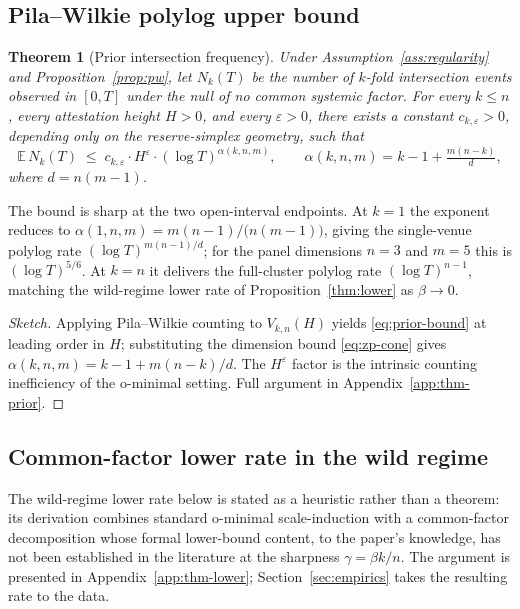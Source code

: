 \documentclass[12pt]{article}
\theoremstyle{sampledef}
\theoremstyle{sampleplain}
\newtheorem{theorem}[definition]{Theorem}
\theoremstyle{sampleremark}
\newcommand{\E}{\mathbb{E}}
\newcommand{\1}{\mathbf{1}}
\begin{document}
\subsection{Pila--Wilkie polylog upper bound}\label{sec:thm-prior}

\begin{theorem}[Prior intersection frequency]\label{thm:prior}
Under Assumption~\ref{ass:regularity} and
Proposition~\ref{prop:pw}, let $N_k(T)$ be the number of $k$-fold
intersection events observed in $[0,T]$ under the null of no common
systemic factor. For every $k \le n$, every attestation height
$H > 0$, and every $\varepsilon > 0$, there exists a constant
$c_{k,\varepsilon} > 0$, depending only on the reserve-simplex
geometry, such that
\begin{equation}\label{eq:prior-bound}
\E\,N_k(T) \;\le\; c_{k,\varepsilon} \cdot H^{\varepsilon}
\cdot (\log T)^{\alpha(k,n,m)},
\qquad
\alpha(k,n,m) = k - 1 + \tfrac{m(n-k)}{d},
\end{equation}
where $d = n(m-1)$.
\end{theorem}

The bound is sharp at the two open-interval endpoints. At $k = 1$
the exponent reduces to $\alpha(1,n,m) = m(n-1)/\bigl(n(m-1)\bigr)$,
giving the single-venue polylog rate $(\log T)^{m(n-1)/d}$; for
the panel dimensions $n=3$ and $m=5$ this is $(\log T)^{5/6}$. At
$k = n$ it delivers the full-cluster polylog rate
$(\log T)^{n-1}$, matching the wild-regime lower rate of
Proposition~\ref{thm:lower} as $\beta \to 0$.

\begin{proof}[Sketch]
Applying Pila--Wilkie counting \citep{PilaWilkie2006,
Pila2011ManinMumford} to $V_{k,n}(H)$ yields \eqref{eq:prior-bound}
at leading order in $H$; substituting the dimension bound
\eqref{eq:zp-cone} gives $\alpha(k,n,m) = k-1 + m(n-k)/d$. The
$H^\varepsilon$ factor is the intrinsic counting inefficiency of
the o-minimal setting. Full argument in
Appendix~\ref{app:thm-prior}.
\end{proof}

\subsection{Common-factor lower rate in the wild regime}
\label{sec:thm-lower}

The wild-regime lower rate below is stated as a heuristic rather
than a theorem: its derivation combines standard o-minimal
scale-induction with a common-factor decomposition whose formal
lower-bound content, to the paper's knowledge, has not been
established in the literature at the sharpness
$\gamma = \beta k/n$. The argument is presented in
Appendix~\ref{app:thm-lower}; Section~\ref{sec:empirics} takes the
resulting rate to the data.
\end{document}
